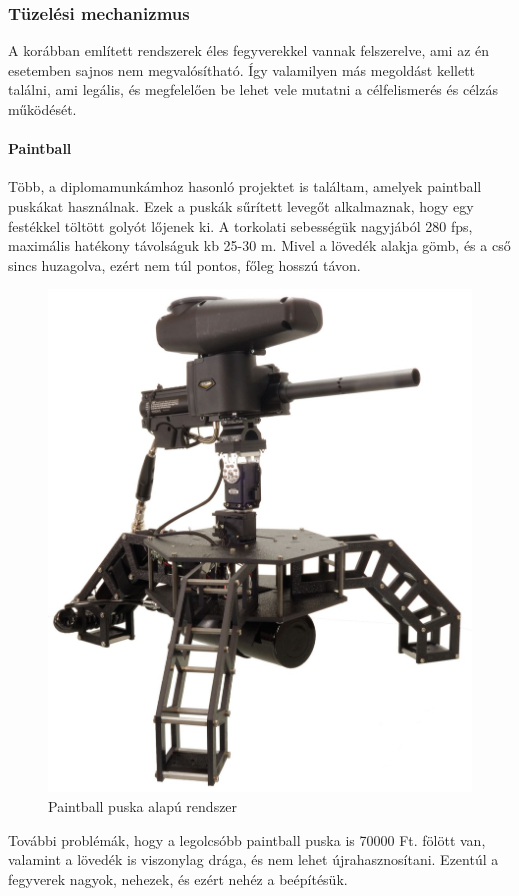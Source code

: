 \documentclass[12pt,a4paper]{article}
\begin{document}
\pagebreak

\subsubsection{Tüzelési mechanizmus}

A korábban említett rendszerek éles fegyverekkel vannak felszerelve, ami az én esetemben sajnos nem megvalósítható. Így valamilyen más megoldást kellett találni, ami legális, és megfelelően be lehet vele mutatni a célfelismerés és célzás működését. 


\paragraph{Paintball}

Több, a diplomamunkámhoz hasonló projektet is találtam, amelyek paintball puskákat használnak. Ezek a puskák sűrített levegőt alkalmaznak, hogy egy festékkel töltött golyót lőjenek ki. A torkolati sebességük nagyjából 280 fps, maximális hatékony távolságuk kb 25-30 m. Mivel a lövedék alakja gömb, és a cső sincs huzagolva, ezért nem túl pontos, főleg hosszú távon.\\

\begin{figure}[h!]
	\centering
	\includegraphics[width=0.6\linewidth]{irod_paintball}
	\caption{Paintball puska alapú rendszer}
	\label{fig:irod_paintball}
\end{figure}

További problémák, hogy a legolcsóbb paintball puska is 70000 Ft. fölött van, valamint a lövedék is viszonylag drága, és nem lehet újrahasznosítani. Ezentúl a fegyverek nagyok, nehezek, és ezért nehéz a beépítésük. 
\end{document}
